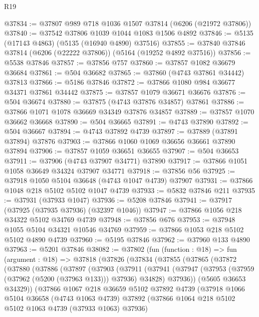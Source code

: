 \begin{lexlean}{R19}
\begin{coremodule}
{{{{{{{{{{{@37834 := @37807 @989 @718 @1036 @1507 @37814 (@6206 (@21972 @37806))
@37840 := @37542 @37806 @1039 @1044 @1083 @1506 @4892
@37846 := @5135 (@17143 @4863) (@5135 (@16940 @4890) @37516)
@37855 := @37840 @37846 @37814 (@6206 (@22222 @37806)) (@5164 (@19252 @4892 @37516))
@37856 := @5538 @37846
@37857 := @37856 @757
@37860 := @37857 @1082 @36679 @36684
@37861 := @504 @36682
@37865 := @37860 (@4743 @37861 @34442) @37813
@37866 := @5186 @37846
@37872 := @37866 @1080 @984 @36677 @34371 @37861 @34442
@37875 := @37857 @1079 @36671 @36676
@37876 := @504 @36674
@37880 := @37875 (@4743 @37876 @34857) @37861
@37886 := @37866 @1071 @1078 @36669 @34349 @37876 @34857
@37889 := @37857 @1070 @36662 @36668
@37890 := @504 @36665
@37891 := @4743 @37890
@37892 := @504 @36667
@37894 := @4743 @37892 @4739
@37897 := @37889 (@37891 @37894) @37876
@37903 := @37866 @1060 @1069 @36656 @36661 @37890 @37894
@37906 := @37857 @1059 @36651 @36655
@37907 := @504 @36653
@37911 := @37906 (@4743 @37907 @34771) @37890
@37917 := @37866 @1051 @1058 @36649 @34324 @37907 @34771
@37918 := @37856 @56
@37925 := @37918 @1050 @5104 @36648 (@4743 @1047 @4739) @37907
@37931 := @37866 @1048 @218 @5102 @5102 @1047 @4739
@37933 := @5832 @37846 @211
@37935 := @37931 (@37933 @1047)
@37936 := @5208 @37846
@37941 := @37917 (@37925 (@37935 @37936) (@32397 @1046))
@37947 := @37866 @1056 @218 @34322 @5102 @34769 @4739
@37948 := @37856 @676
@37953 := @37948 @1055 @5104 @34321 @10546 @34769
@37959 := @37866 @1053 @218 @5102 @5102 @4890 @4739
@37960 := @5195 @37846
@37962 := @37960 @133 @4890
@37963 := @5201 @37846
@38082 := @37802
    (fun (function : @18) =>
    fun (argument : @18) =>
    @37818
      (@37826
        (@37834
          (@37855
            (@37865
              (@37872
                (@37880
                  (@37886
                    (@37897
                      (@37903
                        (@37911
                          (@37941
                            (@37947
                              (@37953 (@37959 (@37962 (@5200 (@37963 @133))) @37936) @34828)
                              @37936))
                          (@5605 @36653 @34329))
                        (@37866
                          @1067
                          @218
                          @36659
                          @5102
                          @37892
                          @4739
                          (@37918
                            @1066
                            @5104
                            @36658
                            (@4743 @1063 @4739)
                            @37892
                            (@37866 @1064 @218 @5102 @5102 @1063 @4739 (@37933 @1063) @37936)
}}}}}}}}}}}
\end{coremodule}
\end{lexlean}
